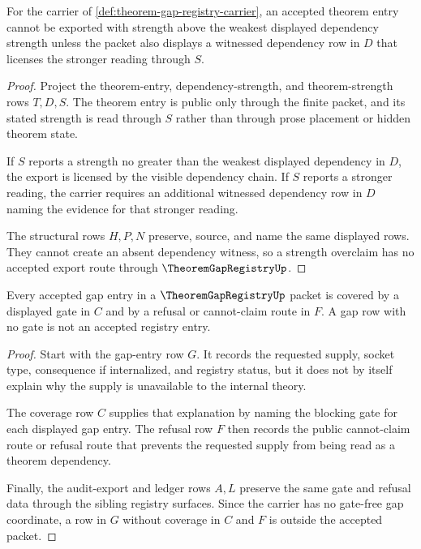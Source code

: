 \begin{theorem}
\label{thm:theorem-gap-registry-strength-gate}
For the carrier of \autoref{def:theorem-gap-registry-carrier}, an accepted theorem entry cannot be exported with strength above the weakest displayed dependency strength unless the packet also displays a witnessed dependency row in $D$ that licenses the stronger reading through $S$.
\end{theorem}
\begin{proof}
Project the theorem-entry, dependency-strength, and theorem-strength rows $T,D,S$. The theorem entry is public only through the finite packet, and its stated strength is read through $S$ rather than through prose placement or hidden theorem state.

If $S$ reports a strength no greater than the weakest displayed dependency in $D$, the export is licensed by the visible dependency chain. If $S$ reports a stronger reading, the carrier requires an additional witnessed dependency row in $D$ naming the evidence for that stronger reading.

The structural rows $H,P,N$ preserve, source, and name the same displayed rows. They cannot create an absent dependency witness, so a strength overclaim has no accepted export route through $\TheoremGapRegistryUp$.
\end{proof}

\begin{theorem}
\label{thm:theorem-gap-registry-gap-gate-coverage}
Every accepted gap entry in a $\TheoremGapRegistryUp$ packet is covered by a displayed gate in $C$ and by a refusal or cannot-claim route in $F$. A gap row with no gate is not an accepted registry entry.
\end{theorem}
\begin{proof}
Start with the gap-entry row $G$. It records the requested supply, socket type, consequence if internalized, and registry status, but it does not by itself explain why the supply is unavailable to the internal theory.

The coverage row $C$ supplies that explanation by naming the blocking gate for each displayed gap entry. The refusal row $F$ then records the public cannot-claim route or refusal route that prevents the requested supply from being read as a theorem dependency.

Finally, the audit-export and ledger rows $A,L$ preserve the same gate and refusal data through the sibling registry surfaces. Since the carrier has no gate-free gap coordinate, a row in $G$ without coverage in $C$ and $F$ is outside the accepted packet.
\end{proof}

